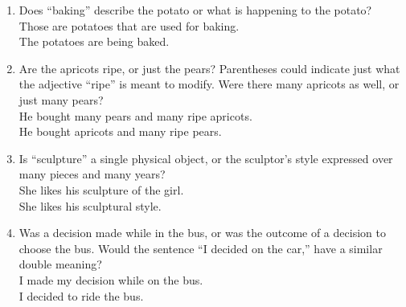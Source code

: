 
\begin{enumerate}
%
\item Does ``baking'' describe the potato or what is happening to the potato?\\
Those are potatoes that are used for baking.\\
The potatoes are being baked.
%
\item Are the apricots ripe, or just the pears?  Parentheses could indicate just what the adjective ``ripe'' is meant to modify.  Were there many apricots as well, or just many pears?\\
He bought many pears and many ripe apricots.\\
He bought apricots and many ripe pears.
%
\item Is ``sculpture'' a single physical object, or the sculptor's style expressed over many pieces and many years?\\
She likes his sculpture of the girl.\\
She likes his sculptural style.
%
\item Was a decision made while in the bus, or was the outcome of a decision to choose the bus.  Would the sentence ``I decided on the car,'' have a similar double meaning?\\
I made my decision while on the bus.\\
I decided to ride the bus.
\end{enumerate}